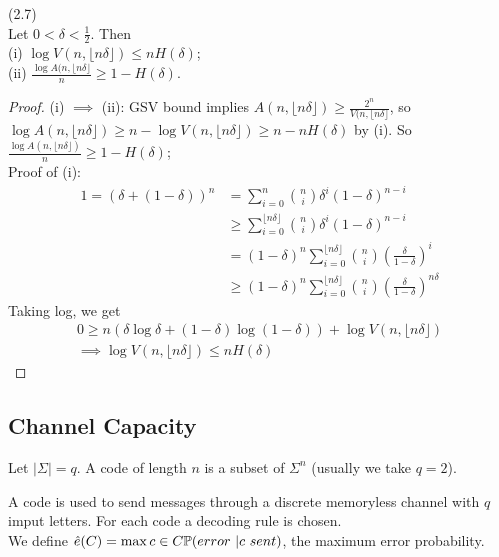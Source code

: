 \documentclass[a4paper]{article}
\begin{document}
\begin{prop} (2.7)\\
Let $0 < \delta < \frac{1}{2}$. Then\\
(i) $\log V(n,\lfloor n\delta\rfloor) \leq nH(\delta)$;\\
(ii) $\frac{\log A(n,\lfloor n\delta\rfloor}{n} \geq 1-H(\delta)$.
\begin{proof}
(i) $\implies$ (ii): GSV bound implies $A(n,\lfloor n\delta\rfloor) \geq \frac{2^n}{V(n,\lfloor n\delta \rfloor}$, so $\log A(n,\lfloor n\delta\rfloor) \geq n-\log V(n,\lfloor n\delta \rfloor) \geq n-nH(\delta)$ by (i). So $\frac{\log A(n,\lfloor n\delta\rfloor)}{n} \geq 1-H(\delta)$;\\
Proof of (i):
\begin{equation*}
\begin{aligned}
1 = (\delta + (1-\delta))^n &= \sum_{i=0}^n {n\choose i} \delta^i (1-\delta)^{n-i}\\
&\geq \sum_{i=0}^{\lfloor n\delta\rfloor} {n \choose i} \delta^i (1-\delta)^{n-i}\\
&= (1-\delta)^n \sum_{i=0}^{\lfloor n\delta\rfloor} {n \choose i} (\frac{\delta}{1-\delta})^i\\
&\geq (1-\delta)^n \sum_{i=0}^{\lfloor n\delta\rfloor} {n \choose i} (\frac{\delta}{1-\delta})^{n\delta}
\end{aligned}
\end{equation*}
Taking log, we get
\begin{equation*}
\begin{aligned}
0 \geq n(\delta\log\delta + (1-\delta) \log(1-\delta)) + \log V(n,\lfloor n\delta\rfloor)\\
\implies \log V(n,\lfloor n\delta \rfloor) \leq nH(\delta)
\end{aligned}
\end{equation*}
\end{proof}
\end{prop}

\subsection{Channel Capacity}
Let $|\Sigma| =q$. A code of length $n$ is a subset of $\Sigma^n$ (usually we take $q=2$).

A code is used to send messages through a discrete memoryless channel with $q$ imput letters. For each code a decoding rule is chosen.\\
We define $\hat{e}(C) = \max{c \in C} \P(error\ | c\ sent)$, the maximum error probability.
\end{document}
